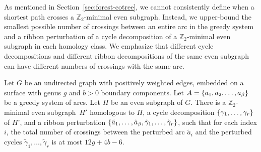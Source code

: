 \documentclass[letterpaper,review]{siamart190516}
\def\Z{\mathbb{Z}}
\begin{document}
As mentioned in Section~\ref{sec:forest-cotree}, we cannot consistently define when a shortest path crosses a $\Z_2$-minimal even subgraph.  Instead, we upper-bound the smallest possible number of crossings between an entire arc in the greedy system and a ribbon perturbation of a cycle decomposition of a $\Z_2$-minimal even subgraph in each homology class.  We emphasize that different cycle decompositions and different ribbon decompositions of the same even subgraph can have different numbers of crossings with the same arc.

\begin{lemma}
\label{lem:crossing}
Let $G$ be an undirected graph with positively weighted edges, embedded on a surface with genus $g$ and $b>0$ boundary components.
Let $A = \left\{ a_1, a_2, \dots, a_\beta \right\}$ be a greedy system of arcs.
Let $H$ be an even subgraph of $G$.
There is a $\Z_2$-minimal even subgraph~$H'$ homologous to $H$, a cycle decomposition $\{ \gamma_1, \dots, \gamma_r \}$ of $H’$, and a ribbon perturbation $\{ \tilde{a}_1,  \dots, \tilde{a}_\beta, \tilde\gamma_1, \dots, \tilde\gamma_r \}$, such that for each index $i$, the total number of crossings between the perturbed arc $\tilde{a}_i$ and the perturbed cycles $\tilde\gamma_1, \dots, \tilde\gamma_r$ is at most $12g+4b-6$.
\end{lemma}

\end{document}
